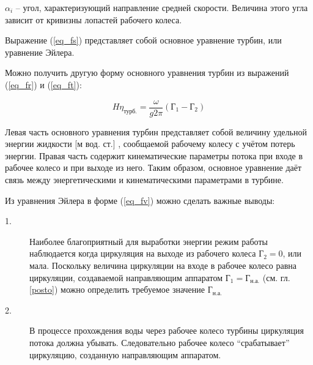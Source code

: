 $\alpha_i$ -- угол, характеризующий направление средней скорости. Величина этого угла зависит от кривизны лопастей рабочего колеса.

\vspace{0.5 cm}

Выражение (\ref{eq_fs}) представляет собой основное уравнение турбин, или уравнение Эйлера.

Можно получить другую форму основного уравнения турбин из выражений (\ref{eq_fr}) и (\ref{eq_ft}):

\begin{equation}
\label{eq_fv}
  \boxed{ H \eta_{\text{турб.}} = \frac{\omega}{g 2 \pi} \left( \text{Г}_1 - \text{Г}_2 \right) }
\end{equation}

Левая часть основного уравнения турбин представляет собой величину удельной энергии жидкости [м вод. ст.]
, сообщаемой рабочему колесу с учётом потерь энергии. Правая часть содержит кинематические параметры потока при входе в рабочее колесо и при выходе из него. Таким образом, основное уравнение даёт связь между энергетическими и кинематическими параметрами в турбине.

Из уравнения Эйлера в форме (\ref{eq_fv}) можно сделать важные выводы:

\begin{description}
\item[1.] Наиболее благоприятный для выработки энергии режим работы наблюдается когда циркуляция на выходе из рабочего колеса $\text{Г}_2 = 0$, или мала. Поскольку величина циркуляции на входе в рабочее колесо равна циркуляции, создаваемой направляющим аппаратом $\text{Г}_1 = \text{Г}_{\text{н.а.}}$ (см. гл. \ref{posto}) можно определить требуемое значение $ \text{Г}_{\text{н.а.}} $

\item[2.] В процессе прохождения воды через рабочее колесо турбины циркуляция потока должна убывать. Следовательно рабочее колесо ``срабатывает'' циркуляцию, созданную направляющим аппаратом.
\end{description}




